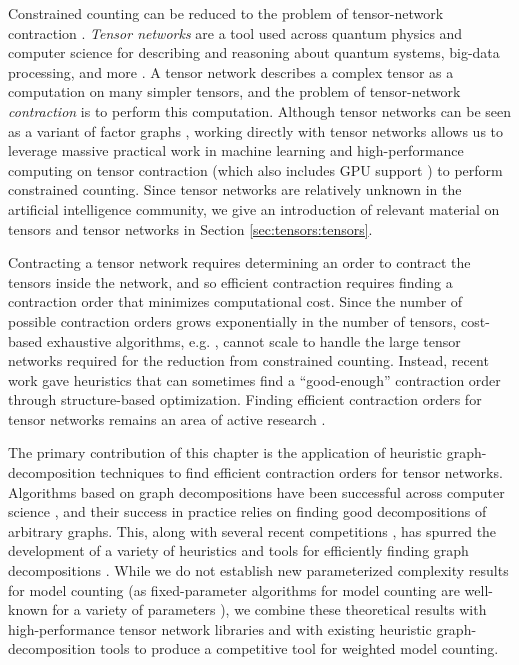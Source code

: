 Constrained counting can be reduced to the problem of tensor-network contraction \cite{BMT15}. \emph{Tensor networks} are a tool used across quantum physics and computer science for describing and reasoning about quantum systems, big-data processing, and more \cite{BB17,Cichocki14,Orus19}. A tensor network describes a complex tensor as a computation on many simpler tensors, and the problem of tensor-network \emph{contraction} is to perform this computation. Although tensor networks can be seen as a variant of factor graphs \cite{KFL01}, working directly with tensor networks allows us to leverage massive practical work in machine learning and high-performance computing on tensor contraction \cite{BK07,Hirata03,KKCLA17,VZTGDMVAC18} (which also includes GPU support \cite{KSTKPPRS19,NRBHHJN15}) to perform constrained counting. Since tensor networks are relatively unknown in the artificial intelligence community, we give an introduction of relevant material on tensors and tensor networks in Section \ref{sec:tensors:tensors}.

Contracting a tensor network requires determining an order to contract the tensors inside the network, and so efficient contraction requires finding a contraction order that minimizes computational cost. Since the number of possible contraction orders grows exponentially in the number of tensors, cost-based exhaustive algorithms, e.g. \cite{PHV14}, cannot scale to handle the large tensor networks required for the reduction from constrained counting. Instead, recent work \cite{KCMR18} gave heuristics that can sometimes find a ``good-enough'' contraction order through structure-based optimization. Finding efficient contraction orders for tensor networks remains an area of active research \cite{RTPCTSL19}.


The primary contribution of this chapter is the application of heuristic graph-decomposition techniques to find efficient contraction orders for tensor networks. Algorithms based on graph decompositions have been successful across computer science \cite{GLST17,MPPV04}, and their success in practice relies on finding good decompositions of arbitrary graphs. This, along with several recent competitions \cite{DKTW18}, has spurred the development of a variety of heuristics and tools for efficiently finding graph decompositions \cite{AMW17,HS18,Tamaki17}. While we do not establish new parameterized complexity results for model counting (as fixed-parameter algorithms for model counting are well-known for a variety of parameters \cite{FMR08,SS10}), we combine these theoretical results with high-performance tensor network libraries and with existing heuristic graph-decomposition tools to produce a competitive tool for weighted model counting.

